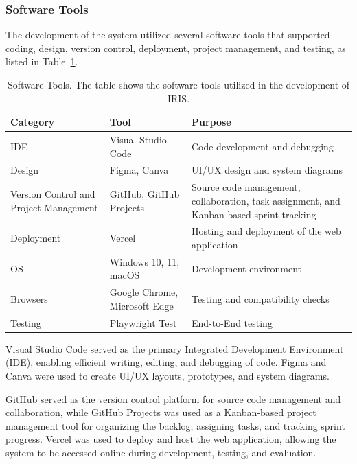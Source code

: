 \subsubsection{Software Tools}
The development of the system utilized several software tools that supported coding, design, version control, deployment, project management, and testing, as listed in Table~\ref{tab:software_tools}.

\begingroup
\setlength{\tabcolsep}{6pt}
\renewcommand{\arraystretch}{1.05}
\small
\begin{table}[H]
\captionsetup{justification=raggedright,singlelinecheck=false}
\caption[Software Tools]{Software Tools. The table shows the software tools utilized in the development of IRIS.}
\label{tab:software_tools}
\begin{tabular}{|p{3cm}|p{5cm}|p{6.2cm}|}
\hline
\textbf{Category} & \textbf{Tool} & \textbf{Purpose} \\
\hline
IDE & Visual Studio Code & Code development and debugging \\
\hline
Design & Figma, Canva & UI/UX design and system diagrams \\
\hline
Version Control and Project Management & GitHub, GitHub Projects & Source code management, collaboration, task assignment, and Kanban-based sprint tracking \\
\hline
Deployment & Vercel & Hosting and deployment of the web application \\
\hline
OS & Windows 10, 11; macOS & Development environment \\
\hline
Browsers & Google Chrome, Microsoft Edge & Testing and compatibility checks \\
\hline
Testing & Playwright Test & End-to-End testing \\
\hline
\end{tabular}
\end{table}
\endgroup

Visual Studio Code served as the primary Integrated Development Environment (IDE), enabling efficient writing, editing, and debugging of code. Figma and Canva were used to create UI/UX layouts, prototypes, and system diagrams.

GitHub served as the version control platform for source code management and collaboration, while GitHub Projects was used as a Kanban-based project management tool for organizing the backlog, assigning tasks, and tracking sprint progress. Vercel was used to deploy and host the web application, allowing the system to be accessed online during development, testing, and evaluation.

